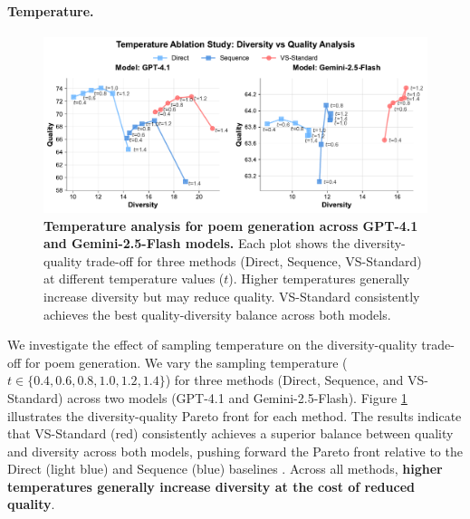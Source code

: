\paragraph{Temperature.} 
\begin{figure}[ht]
    \centering
    \includegraphics[width=1.0\linewidth]{figures/ablation/decoding_strategies/poem_temperature_plot.pdf}
    \caption{\textbf{Temperature analysis for poem generation across GPT-4.1 and Gemini-2.5-Flash models.} Each plot shows the diversity-quality trade-off for three methods (Direct, Sequence, VS-Standard) at different temperature values ($t$). Higher temperatures generally increase diversity but may reduce quality. VS-Standard consistently achieves the best quality-diversity balance across both models.}
    \label{fig:temperature_ablation}
\end{figure}

We investigate the effect of sampling temperature on the diversity-quality trade-off for poem generation. We vary the sampling temperature ($t \in \{0.4, 0.6, 0.8, 1.0, 1.2, 1.4\}$) for three methods (Direct, Sequence, and VS-Standard) across two models (GPT-4.1 and Gemini-2.5-Flash). Figure \ref{fig:temperature_ablation} illustrates the diversity-quality Pareto front for each method. The results indicate that VS-Standard (red) consistently achieves a superior balance between quality and diversity across both models, pushing forward the Pareto front relative to the Direct (light blue) and Sequence (blue) baselines \citep{zhang-etal-2021-trading, padmakumar2025memorizationmappingoriginalityqualityfrontier}. Across all methods, \textbf{higher temperatures generally increase diversity at the cost of reduced quality}.

